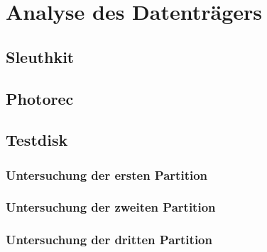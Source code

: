 \chapter{Analyse des Datenträgers} 

\section{Sleuthkit}

\section{Photorec}


\section{Testdisk}



\subsection{Untersuchung der ersten Partition}

\subsection{Untersuchung der zweiten Partition}


\subsection{Untersuchung der dritten Partition}

